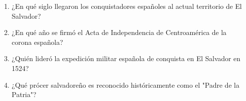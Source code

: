 \documentclass[10pt,a4paper]{article}
\begin{document}
\begin{enumerate}[label=\textbf{\arabic*.}]
\setcounter{enumi}{0}
\item ¿En qué siglo llegaron los conquistadores españoles al actual territorio de El Salvador?
\begin{enumerate}[label=\textbf{\Alph*)}]
\end{enumerate}
\vspace{0.15cm}
\item ¿En qué año se firmó el Acta de Independencia de Centroamérica de la corona española?
\begin{enumerate}[label=\textbf{\Alph*)}]
\end{enumerate}
\vspace{0.15cm}
\item ¿Quién lideró la expedición militar española de conquista en El Salvador en 1524?
\begin{enumerate}[label=\textbf{\Alph*)}]
\end{enumerate}
\vspace{0.15cm}
\item ¿Qué prócer salvadoreño es reconocido históricamente como el "Padre de la Patria"?
\begin{enumerate}[label=\textbf{\Alph*)}]
\end{enumerate}
\end{enumerate}
\end{document}
